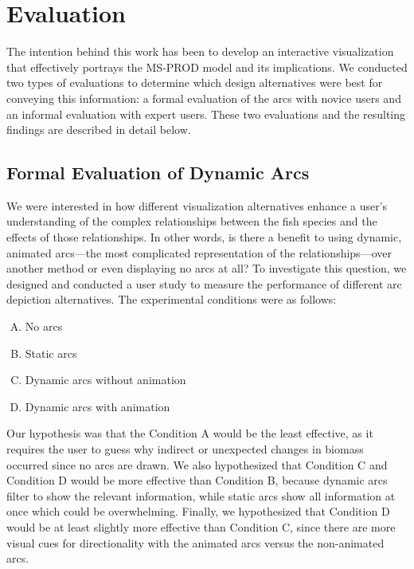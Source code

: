 \chapter{Evaluation}

The intention behind this work has been to develop an interactive visualization that effectively portrays the MS-PROD model and its implications.  We conducted two types of evaluations to determine which design alternatives were best for conveying this information: a formal evaluation of the arcs with novice users and an informal evaluation with expert users.  These two evaluations and the resulting findings are described in detail below. 

\section{Formal Evaluation of Dynamic Arcs}

We were interested in how different visualization alternatives enhance a user's understanding of the complex relationships between the fish species and the effects of those relationships.  In other words, is there a benefit to using dynamic, animated arcs---the most complicated representation of the relationships---over another method or even displaying no arcs at all?  To investigate this question, we designed and conducted a user study to measure the performance of different arc depiction alternatives.  The experimental conditions were as follows:

\begin{enumerate}[(A)]
\item No arcs
\item Static arcs
\item Dynamic arcs without animation
\item Dynamic arcs with animation
\end{enumerate}

Our hypothesis was that the Condition A would be the least effective, as it requires the user to guess why indirect or unexpected changes in biomass occurred since no arcs are drawn.  We also hypothesized that Condition C and Condition D would be more effective than Condition B, because dynamic arcs filter to show the relevant information, while static arcs show all information at once which could be overwhelming.  Finally, we hypothesized that Condition D would be at least slightly more effective than Condition C, since there are more visual cues for directionality with the animated arcs versus the non-animated arcs.

